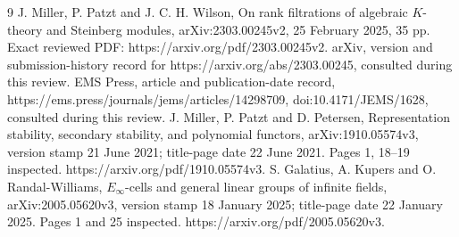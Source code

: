 \documentclass[10pt]{article}
\begin{document}
9 J. Miller, P. Patzt and J. C. H. Wilson, On rank filtrations of algebraic \(K\)-theory and Steinberg modules, arXiv:2303.00245v2, 25 February 2025, 35 pp. Exact reviewed PDF: https://arxiv.org/pdf/2303.00245v2. arXiv, version and submission-history record for https://arxiv.org/abs/2303.00245, consulted during this review. EMS Press, article and publication-date record, https://ems.press/journals/jems/articles/14298709, doi:10.4171/JEMS/1628, consulted during this review. J. Miller, P. Patzt and D. Petersen, Representation stability, secondary stability, and polynomial functors, arXiv:1910.05574v3, version stamp 21 June 2021; title-page date 22 June 2021. Pages 1, 18–19 inspected. https://arxiv.org/pdf/1910.05574v3. S. Galatius, A. Kupers and O. Randal-Williams, \(E_\infty\)-cells and general linear groups of infinite fields, arXiv:2005.05620v3, version stamp 18 January 2025; title-page date 22 January 2025. Pages 1 and 25 inspected. https://arxiv.org/pdf/2005.05620v3.\par
\end{document}
